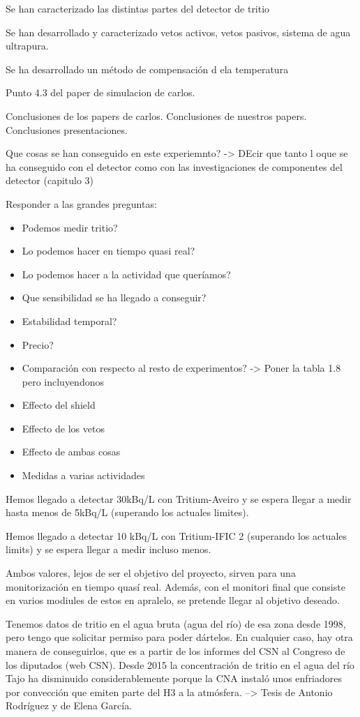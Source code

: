 Se han caracterizado las distintas partes del detector de tritio

Se han desarrollado y caracterizado vetos activos, vetos pasivos, sistema de agua ultrapura.

Se ha desarrollado un método de compensación d ela temperatura



Punto 4.3 del paper de simulacion de carlos.

Conclusiones de los papers de carlos.
Conclusiones de nuestros papers.
Conclusiones presentaciones.

Que cosas se han conseguido en este experiemnto? -> DEcir que tanto l oque se ha conseguido con el detector como con las investigaciones de componentes del detector (capitulo 3)

Responder a las grandes preguntas: 
\begin{itemize}
\item{} Podemos medir tritio? 
\item{} Lo podemos hacer en tiempo quasi real? 
\item{}Lo podemos hacer a la actividad que queríamos? 
\item{} Que sensibilidad se ha llegado a conseguir?
\item{} Estabilidad temporal?
\item{} Precio?
\item{} Comparación con respecto al resto de experimentos? -> Poner la tabla 1.8 pero incluyendonos
\item{} Effecto del shield
\item{} Effecto de los vetos
\item{} Effecto de ambas cosas
\item{} Medidas a varias actividades
\end{itemize}


Hemos llegado a detectar 30kBq/L con Tritium-Aveiro y se espera llegar a medir hasta menos de 5kBq/L (superando los actuales limites).

Hemos llegado a detectar 10 kBq/L con Tritium-IFIC 2 (superando los actuales limits) y se espera llegar a medir incluso menos.

Ambos valores, lejos de ser el objetivo del proyecto, sirven para una monitorización en tiempo quasí real. Además, con el monitori final que consiste en varios modiules de estos en apralelo, se pretende llegar al objetivo deseado.


Tenemos datos de tritio en el agua bruta (agua del río) de esa zona desde 1998, pero tengo que solicitar permiso para poder dártelos. En cualquier caso, hay otra manera de conseguirlos, que es a partir  de los informes del CSN al Congreso de los diputados (web CSN).
Desde 2015 la concentración de tritio en el agua del río Tajo ha disminuido considerablemente porque la CNA instaló unos enfriadores por convección que emiten parte del H3 a la atmósfera. --> Tesis de Antonio Rodríguez y de Elena García.

